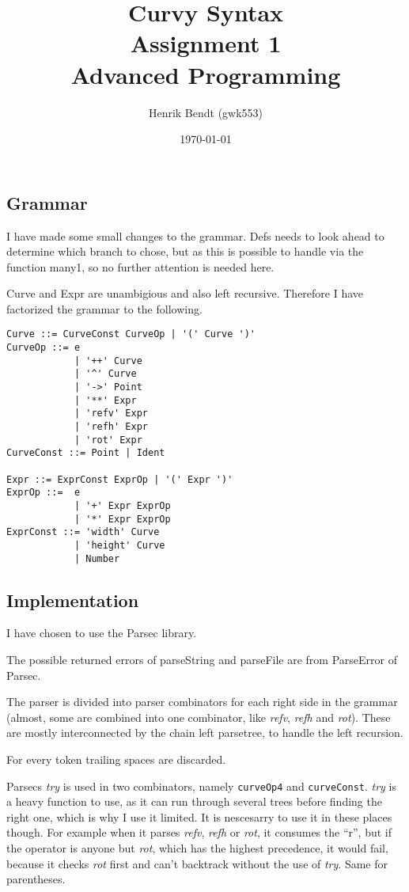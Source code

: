 \documentclass[a4paper, 10pt]{article}
\author{Henrik Bendt (gwk553)}
\title{Curvy Syntax\\Assignment 1\\Advanced Programming}
\date{\today}
\begin{document}
\maketitle
\pagebreak

\subsection*{Grammar}
I have made some small changes to the grammar.
Defs needs to look ahead to determine which branch to chose, but as this is possible to handle via the function many1, so no further attention is needed here.

Curve and Expr are unambigious and also left recursive. 
Therefore I have factorized the grammar to the following.

\begin{verbatim}
Curve ::= CurveConst CurveOp | '(' Curve ')'
CurveOp ::= e 
            | '++' Curve 
            | '^' Curve
            | '->' Point
            | '**' Expr
            | 'refv' Expr
            | 'refh' Expr
            | 'rot' Expr
CurveConst ::= Point | Ident

Expr ::= ExprConst ExprOp | '(' Expr ')'
ExprOp ::=  e 
            | '+' Expr ExprOp
            | '*' Expr ExprOp
ExprConst ::= 'width' Curve 
            | 'height' Curve 
            | Number

\end{verbatim}

\subsection*{Implementation}
I have chosen to use the Parsec library.

The possible returned errors of parseString and parseFile are from ParseError of Parsec.

The parser is divided into parser combinators for each right side in the grammar (almost, some are combined into one combinator, like \textit{refv}, \textit{refh} and \textit{rot}). These are mostly interconnected by the chain left parsetree, to handle the left recursion.

For every token trailing spaces are discarded. 

Parsecs \textit{try} is used in two combinators, namely \texttt{curveOp4} and \texttt{curveConst}. \textit{try} is a heavy function to use, as it can run through several trees before finding the right one, which is why I use it limited. It is nescesarry to use it in these places though. For example when it parses \textit{refv}, \textit{refh} or \textit{rot}, it consumes the ``r'', but if the operator is anyone but \textit{rot}, which has the highest precedence, it would fail, because it checks \textit{rot} first and can't backtrack without the use of \textit{try}. Same for parentheses.
\end{document}
